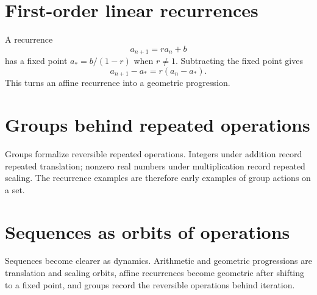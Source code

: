 \section{First-order linear recurrences}

A recurrence
\[
  a_{n+1}=ra_n+b
\]
has a fixed point \(a_*=b/(1-r)\) when \(r\ne1\).  Subtracting the fixed point gives
\[
  a_{n+1}-a_*=r(a_n-a_*).
\]
This turns an affine recurrence into a geometric progression.

\section{Groups behind repeated operations}

Groups formalize reversible repeated operations.  Integers under addition record repeated translation; nonzero real numbers under multiplication record repeated scaling.  The recurrence examples are therefore early examples of group actions on a set.

\section{Sequences as orbits of operations}

Sequences become clearer as dynamics.  Arithmetic and geometric progressions are translation and scaling orbits, affine recurrences become geometric after shifting to a fixed point, and groups record the reversible operations behind iteration.
